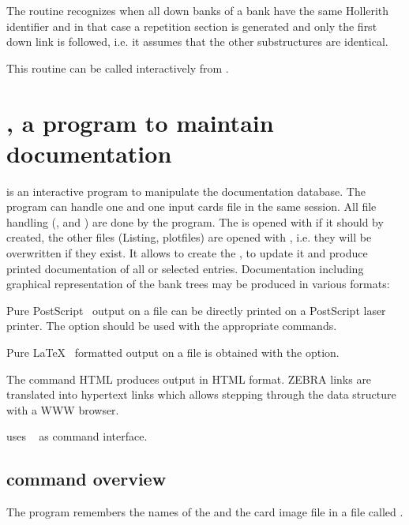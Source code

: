 The routine recognizes when all down banks of a bank have the same
Hollerith identifier and in that case a repetition section is generated
and only the first down link is followed, i.e. it assumes that
the other substructures are identical.
 
This routine can be called interactively from .
 
\section[{\tt DZEDIT}, a program to maintain documentation]%
        {, a program to maintain documentation}
\label{sec:dzdocdzedit}  
 
 is an interactive program to manipulate the documentation
database.
The program can handle one \RZfile{} and one input
cards file in the same session. 
All file handling (,  and ) 
are done by the program. 
The \RZfile{} is opened with  
if it should by created, the other files
(Listing, plotfiles) are opened with ,
i.e. they will be overwritten if they exist.
It allows to create the \RZfile,  to update it and
produce printed documentation of all or selected entries.
Documentation including graphical representation of the bank trees
may be produced in various formats:
 
\begin{ULc}
\item Pure PostScript~\cite{Adobe:red2} output on a file  can be
      directly printed on a PostScript laser printer.
      The  option should be used with the appropriate commands.
\item Pure \LaTeX~\cite{bib-LATEX} formatted output on a file  
      is obtained with the  option.
\item The command HTML produces output in HTML format.
      ZEBRA links are translated into hypertext links which allows
      stepping through the data structure with a WWW browser. 
\end{ULc}
 
 uses ~\cite{bib-KUIP} as command interface. 
 
\subsection[{\tt DZEDIT} command overview]{ command overview}
The program remembers the names of the \RZfile{} and the card image
file in a file called .
 
